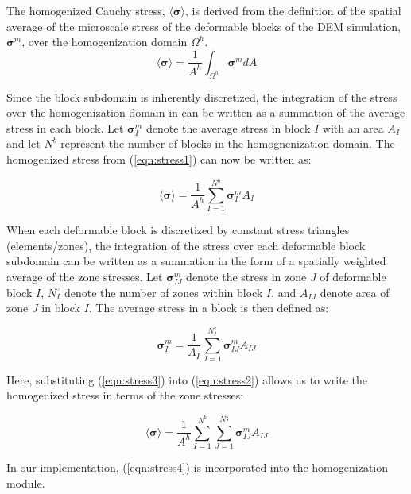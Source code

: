 The homogenized Cauchy stress, $\langle\boldsymbol{\sigma}\rangle$, is derived from the definition of the spatial average of the microscale stress of the deformable blocks of the DEM simulation, $\boldsymbol{\sigma}^m$, over the homogenization domain $\Omega^{h}$. 
\begin{equation}
\langle\boldsymbol{\sigma}\rangle=\frac{1}{A^{h}}\int_{\Omega^{h}}\boldsymbol{\sigma}^m dA\label{eqn:stress1}
\end{equation}

Since the block subdomain is inherently discretized, the integration of the stress over the homogenization domain in can be written as a summation of the average stress in each block. Let $\boldsymbol{\sigma}_{I}^{m}$ denote the average stress in block $I$ with an area $A_{I}$ and let $N^{b}$ represent the number of blocks in the homognenization domain. The homogenized stress from (\ref{eqn:stress1}) can now be written as:

\begin{equation}
\langle\boldsymbol{\sigma}\rangle=\frac{1}{A^{h}}\sum_{I=1}^{N^{b}}\boldsymbol{\sigma}_{I}^{m}A_{I}\label{eqn:stress2}
\end{equation}

When each deformable block is discretized by constant stress triangles (elements/zones), the integration of the stress over each deformable block subdomain can be written as a summation in the form of a spatially weighted average of the zone stresses. Let $\boldsymbol{\sigma}_{IJ}^{m}$ denote the stress in zone $J$ of deformable block $I$, $N_{I}^{z}$ denote the number of zones within block $I$, and $A_{IJ}$ denote area of zone $J$ in block $I$. The average stress in a block is then defined as:

\begin{equation}
\boldsymbol{\sigma}_{I}^{m}=\frac{1}{A_{I}}\sum_{J=1}^{N_{I}^{z}}\boldsymbol{\sigma}_{IJ}^{m}A_{IJ}\label{eqn:stress3}
\end{equation}

Here, substituting (\ref{eqn:stress3}) into (\ref{eqn:stress2}) allows us to write the homogenized stress in terms of the zone stresses:

\begin{equation}
\langle\boldsymbol{\sigma}\rangle=\frac{1}{A^{h}}\sum_{I=1}^{N^{b}}\sum_{J=1}^{N_{I}^{z}}\boldsymbol{\sigma}_{IJ}^{m}A_{IJ}\label{eqn:stress4}
\end{equation}

In our implementation, (\ref{eqn:stress4}) is incorporated into the homogenization module.

